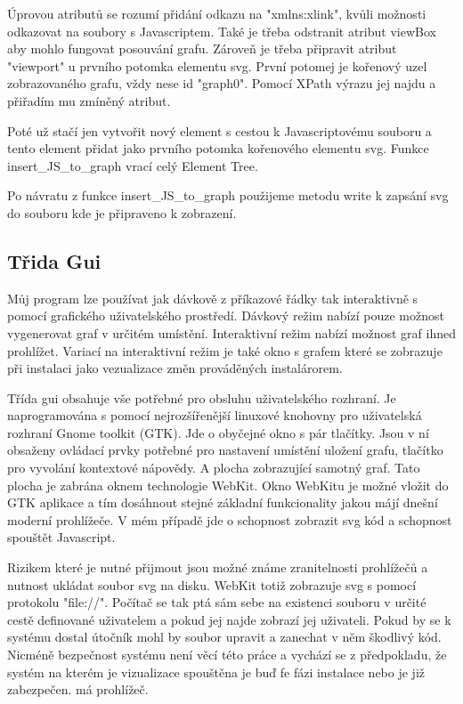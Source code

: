 \documentclass[color,table,oneside,nolot,nolof]{fithesis}
\begin{document}
	Úprovou atributů se rozumí přidání odkazu na "xmlns:xlink", kvůli možnosti odkazovat na soubory s Javascriptem. Také je třeba odstranit atribut viewBox aby mohlo fungovat posouvání
	grafu. Zároveň je třeba připravit atribut "viewport" u prvního potomka elementu svg. První potomej je kořenový uzel zobrazovaného grafu, vždy nese id "graph0". Pomocí XPath výrazu jej
	najdu a přiřadím mu zmíněný atribut.

	Poté už stačí jen vytvořit nový element s cestou k Javascriptovému souboru a tento element přidat jako prvního potomka kořenového elementu svg. Funkce insert_JS_to_graph vrací celý
	Element Tree.

	Po návratu z funkce insert_JS_to_graph použijeme metodu write k zapsání svg do souboru kde je připraveno k zobrazení.

\subsection{Třida Gui}
	Můj program lze používat jak dávkově z příkazové řádky tak interaktivně s pomocí grafického uživatelského prostředí. Dávkový režim nabízí pouze možnost vygenerovat graf v určitém 
	umístění. Interaktivní režim nabízí možnost graf ihned prohlížet. Variací na interaktivní režim je také okno s grafem které se zobrazuje při instalaci jako vezualizace změn prováděných
	instalárorem. 

	Třída gui obsahuje vše potřebné pro obsluhu uživatelského rozhraní. Je naprogramována s pomocí nejrozšířenější linuxové knohovny pro uživatelská rozhraní Gnome toolkit (GTK). Jde o 
	obyčejné okno s pár tlačítky. Jsou v ní obsaženy ovládací prvky potřebné pro nastavení umístění uložení grafu, tlačítko pro vyvolání kontextové
	nápovědy. A plocha zobrazující samotný graf. Tato plocha je zabrána oknem technologie WebKit. Okno WebKitu je možné vložit do GTK aplikace a tím dosáhnout stejné základní funkcionality
	jakou májí dnešní moderní prohlížeče. V mém případě jde o schopnost zobrazit svg kód a schopnost spouštět Javascript.

	Rizikem které je nutné přijmout jsou možné známe zranitelnosti prohlížečů a nutnost ukládat soubor svg na disku. WebKit totiž zobrazuje svg s pomocí protokolu "file://". Počítač se
	tak ptá sám sebe na existenci souboru v určité cestě definované uživatelem a pokud jej najde zobrazí jej uživateli. Pokud by se k systému dostal útočník mohl by soubor upravit a 
	zanechat v něm škodlivý kód. Nicméně bezpečnost systému není věcí této práce a vychází se z předpokladu, že systém na kterém je vizualizace spouštěna je buď fe fázi instalace nebo
	je již zabezpečen.
	má prohlížeč.
\end{document}
